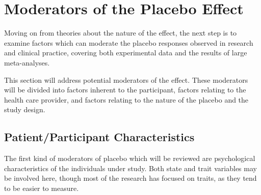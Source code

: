\section{Moderators of the Placebo Effect}
\label{sec:moder-plac-effect}

Moving on from theories about the nature of the effect, the next step is to examine factors which can moderate the placebo responses observed in research and clinical practice, covering both experimental data and the results of large meta-analyses. 


This section will address potential moderators of the effect.
These moderators will be divided into factors inherent to the participant, factors relating to the health care provider, and factors relating to the nature of the placebo and the study design. 





\subsection{Patient/Participant Characteristics}
\label{sec:psych-char}

The first kind of moderators of placebo which will be reviewed are psychological characteristics of the individuals under study. Both state and trait variables may be involved here, though most of the research has focused on traits, as they tend to be easier to measure. 

